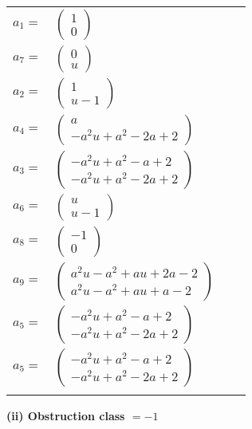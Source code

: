 \documentclass[1p]{elsarticle_modified}
\theoremstyle{definition}
\begin{document}
\begin{tabular}{m{7pt} m{180pt} m{7pt} m{180pt} }
\flushright $a_{1}=$&$\begin{pmatrix}1\\0\end{pmatrix}$ \\
\flushright $a_{7}=$&$\begin{pmatrix}0\\u\end{pmatrix}$ \\
\flushright $a_{2}=$&$\begin{pmatrix}1\\u-1\end{pmatrix}$ \\
\flushright $a_{4}=$&$\begin{pmatrix}a\\- a^2 u+a^2-2 a+2\end{pmatrix}$ \\
\flushright $a_{3}=$&$\begin{pmatrix}- a^2 u+a^2- a+2\\- a^2 u+a^2-2 a+2\end{pmatrix}$ \\
\flushright $a_{6}=$&$\begin{pmatrix}u\\u-1\end{pmatrix}$ \\
\flushright $a_{8}=$&$\begin{pmatrix}-1\\0\end{pmatrix}$ \\
\flushright $a_{9}=$&$\begin{pmatrix}a^2 u- a^2+a u+2 a-2\\a^2 u- a^2+a u+a-2\end{pmatrix}$ \\
\flushright $a_{5}=$&$\begin{pmatrix}- a^2 u+a^2- a+2\\- a^2 u+a^2-2 a+2\end{pmatrix}$\\ \flushright $a_{5}=$&$\begin{pmatrix}- a^2 u+a^2- a+2\\- a^2 u+a^2-2 a+2\end{pmatrix}$\\&\end{tabular}
\flushleft \textbf{(ii) Obstruction class $= -1$}\\~\\
\end{document}
